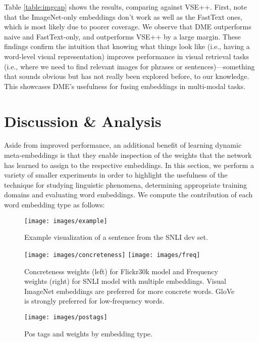 \documentclass[11pt,a4paper]{article}
\begin{document}
Table \ref{table:imgcap} shows the results, comparing against VSE++. First, note that the ImageNet-only embeddings don't work as well as the FastText ones, which is most likely due to poorer coverage. We observe that DME outperforms naive and FastText-only, and outperforms VSE++ by a large margin. These findings confirm the intuition that knowing what things look like (i.e., having a word-level visual representation) improves performance in visual retrieval tasks (i.e., where we need to find relevant images for phrases or sentences)---something that sounds obvious but has not really been explored before, to our knowledge. This showcases DME's usefulness for fusing embeddings in multi-modal tasks.

\section{Discussion \& Analysis}
\label{sec:analysis}

Aside from improved performance, an additional benefit of learning dynamic meta-embeddings is that they enable inspection of the weights that the network has learned to assign to the respective embeddings. In this section, we perform a variety of smaller experiments in order to highlight the usefulness of the technique for studying linguistic phenomena, determining appropriate training domains and evaluating word embeddings. We compute the contribution of each word embedding type as follows:



\begin{figure*}[t]
\centering
\texttt{[image: images/example]}
\caption{Example visualization of a sentence from the SNLI dev set.}
\label{fig:visualization-example}
\end{figure*}


\begin{figure*}[t]
\centering
\texttt{[image: images/concreteness]}
\texttt{[image: images/freq]}
\caption{Concreteness weights (left) for Flickr30k model and Frequency weights (right) for SNLI model with multiple embeddings. Visual ImageNet embeddings are preferred for more concrete words. GloVe is strongly preferred for low-frequency words.}
\label{fig:freq-and-conc}
\end{figure*}

\begin{figure}[t]
\centering
\texttt{[image: images/postags]}
\caption{Pos tags and weights by embedding type.}
\label{fig:postags}
\end{figure}
\end{document}
